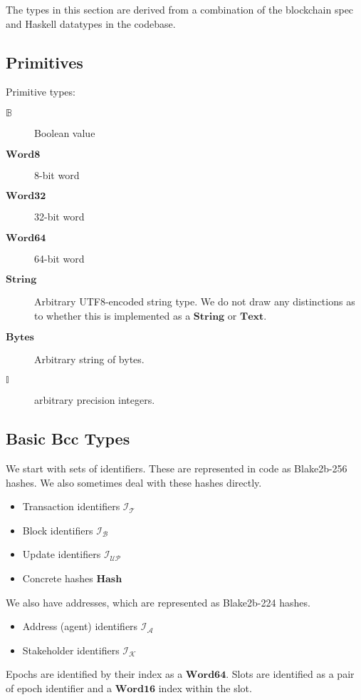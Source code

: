 \documentclass{article}
\newcommand{\idsof}[1]{\mathcal{I}\!_#1}
\newcommand{\txids}{\idsof{\txs}}
\newcommand{\blockids}{\idsof{\blocks}}
\newcommand{\agentids}{\idsof{\agents}}
\newcommand{\updids}{\idsof{\mathcal{UP}}}
\newcommand{\stakeholderids}{\idsof{\mathcal{K}}}
\newcommand{\agents}{\mathcal{A}}
\newcommand{\txs}{\mathcal{T}}
\newcommand{\blocks}{\mathcal{B}}
\newcommand{\hstype}[1]{\textbf{#1}}
\newcommand{\String}{\hstype{String}}
\newcommand{\Word}[1]{\hstype{Word#1}}
\newcommand{\hash}{\hstype{Hash}}
\newcommand{\Integer}{\mathbb{I}}
\newcommand{\Bool}{\mathbb{B}}
\newcommand{\Bytes}{\hstype{Bytes}}
\begin{document}
The types in this section are derived from a combination of the blockchain spec
and Haskell datatypes in the codebase.

\subsection{Primitives}

Primitive types:

\begin{description}
\item [$\Bool$] Boolean value
\item [$\Word{8}$] 8-bit word
\item [$\Word{32}$] 32-bit word
\item [$\Word{64}$] 64-bit word
\item [$\String$] Arbitrary UTF8-encoded string type. We do not draw any
  distinctions as to whether this is implemented as a $\hstype{String}$ or
  $\hstype{Text}$.
\item [$\Bytes$] Arbitrary string of bytes.
\item [$\Integer$] arbitrary precision integers.
\end{description}

\subsection{Basic Bcc Types}

We start with sets of identifiers. These are represented in code as Blake2b-256
hashes. We also sometimes deal with these hashes directly.

\begin{itemize}
\item{Transaction identifiers $\txids$}
\item{Block identifiers $\blockids$}
\item Update identifiers $\updids$
\item Concrete hashes $\hash$
\end{itemize}

We also have addresses, which are represented as Blake2b-224 hashes.

\begin{itemize}
\item{Address (agent) identifiers $\agentids$}
\item Stakeholder identifiers $\stakeholderids$
\end{itemize}

Epochs are identified by their index as a $\Word{64}$. Slots are identified as a
pair of epoch identifier and a $\Word{16}$ index within the slot.
\end{document}
